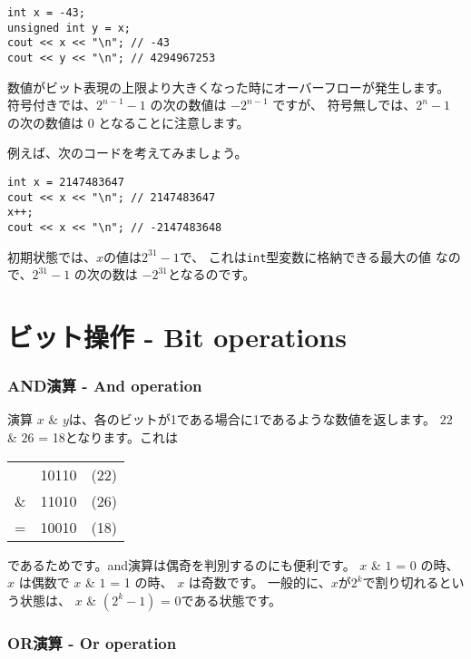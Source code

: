 \begin{lstlisting}
int x = -43;
unsigned int y = x;
cout << x << "\n"; // -43
cout << y << "\n"; // 4294967253
\end{lstlisting}

数値がビット表現の上限より大きくなった時にオーバーフローが発生します。
符号付きでは、$2^{n-1}-1$ の次の数値は $-2^{n-1}$ ですが、
符号無しでは、$2^n-1$ の次の数値は $0$ となることに注意します。

例えば、次のコードを考えてみましょう。
\begin{lstlisting}
int x = 2147483647
cout << x << "\n"; // 2147483647
x++;
cout << x << "\n"; // -2147483648
\end{lstlisting}

初期状態では、$x$の値は$2^{31}-1$で、
これは\texttt{int}型変数に格納できる最大の値 なので、$2^{31}-1$ の次の数は $-2^{31}$となるのです。

\section{ビット操作 - Bit operations}

\newcommand\XOR{\mathbin{\char`\^}}

\subsubsection{AND演算 - And operation}


 演算 $x$ \& $y$は、各のビットが1である場合に1であるような数値を返します。
$22$ \& $26$ = 18となります。これは
\begin{center}
\begin{tabular}{rrr}
& 10110 & (22)\\
\& & 11010 & (26) \\
\hline
 = & 10010 & (18) \\
\end{tabular}
\end{center}

であるためです。and演算は偶奇を判別するのにも便利です。
$x$ \& $1$ = 0 の時、 $x$ は偶数で
$x$ \& $1$ = 1 の時、 $x$ は奇数です。
一般的に、$x$が$2^k$で割り切れるという状態は、
$x$ \& $(2^k-1)$ = 0である状態です。

\subsubsection{OR演算 - Or operation}


